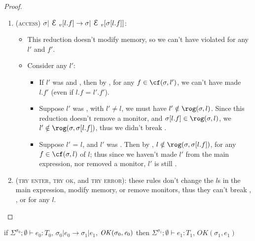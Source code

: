 \begin{proof}
\begin{enumerate}
\item (\textsc{access}) $\sigma|\EV[l.f]\rightarrow \sigma|\EV[\s[l.f]]$:
\begin{itemize}
	\item This reduction doesn't modify memory, so we can't have violated \CNC for any $l'$ and $f'$.
	\item Consider any $l'$:
	\begin{itemize}
		\item If $l'$ was \CNE and \CNA, then by , for any $f \in \cf(\s, l')$, we can't have made $l.f'$ \tmuty (even if $l.f$ = $l'.f'$).
		\item Suppose $l'$ was \CNO, with $l' \neq l$, we must have $l' \notin \rog(\s, l)$. Since this reduction doesn't remove a monitor, and $\s[l.f] \in \rog(\s, l)$, we $l' \notin \rog(\s, \s[l.f])$, thus we didn't break \CNO.
		\item Suppose $l'$ = $l$, and $l'$ was \CNO. Then by \CNC, $l \notin \rog(\s, \s[l.f])$, for any $f \in \cf(\s, l)$ of $l$; thus since we haven't made $l'$ \reach from the main expression, nor removed a monitor, $l'$ is still \CNO.
	\end{itemize}
\end{itemize}
\item (\textsc{try enter}, \textsc{try ok}, and \textsc{try error}):
these rules don't change the $l$s in the main expression, modify memory, or remove monitors, thus they can't break \CNC, \CNE, or \CNO for any $l$.
\end{enumerate}
\end{proof}
\vfill
\clearpage
{}
\begin{theorem}\rm
if $\Sigma^{\sigma_0};\emptyset\vdash e_0: T_0$,
$\sigma_0|e_0\rightarrow \sigma_1|e_1$,
$\mathit{OK}(\sigma_0,{\mathit{e}}_0)$
then
$\Sigma^{\sigma_1};\emptyset\vdash e_1: T_1$,
$\mathit{OK}(\sigma_1,e_1)$
\end{theorem}

